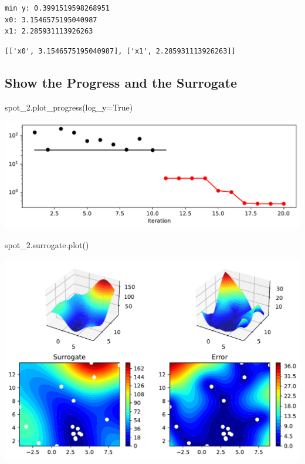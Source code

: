 \documentclass[
  letterpaper,
  DIV=11,
  numbers=noendperiod]{scrreprt}
\newenvironment{Shaded}{\begin{snugshade}}{\end{snugshade}}
\newcommand{\NormalTok}[1]{\textcolor[rgb]{0.00,0.23,0.31}{#1}}
\newcommand{\OperatorTok}[1]{\textcolor[rgb]{0.37,0.37,0.37}{#1}}
\newcommand{\VariableTok}[1]{\textcolor[rgb]{0.07,0.07,0.07}{#1}}
\begin{document}
\begin{verbatim}
min y: 0.3991519598268951
x0: 3.1546575195040987
x1: 2.285931113926263
\end{verbatim}

\begin{verbatim}
[['x0', 3.1546575195040987], ['x1', 2.285931113926263]]
\end{verbatim}

\subsection{Show the Progress and the
Surrogate}\label{show-the-progress-and-the-surrogate}

\begin{Shaded}
\begin{Highlighting}[]
\NormalTok{spot\_2.plot\_progress(log\_y}\OperatorTok{=}\VariableTok{True}\NormalTok{)}
\end{Highlighting}
\end{Shaded}

\includegraphics{010_num_spot_sklearn_surrogate_files/figure-pdf/cell-8-output-1.pdf}

\begin{Shaded}
\begin{Highlighting}[]
\NormalTok{spot\_2.surrogate.plot()}
\end{Highlighting}
\end{Shaded}

\includegraphics{010_num_spot_sklearn_surrogate_files/figure-pdf/cell-9-output-1.pdf}
\end{document}
